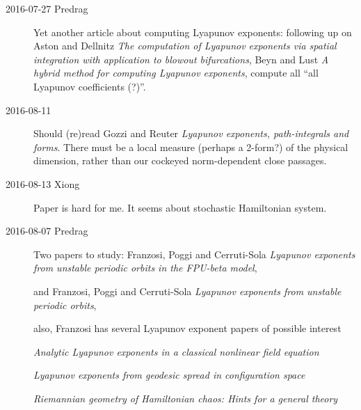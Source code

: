 \begin{description}
\item[2016-07-27 Predrag] Yet another article about computing Lyapunov
exponents: following up on Aston and Dellnitz {\em The
computation of {Lyapunov} exponents via spatial integration with
application to blowout bifurcations}, Beyn and Lust
{\em A hybrid method for computing Lyapunov exponents}, compute all ``all
Lyapunov coefficients (?)''.

\item[2016-08-11]
Should (re)read Gozzi and Reuter {\em Lyapunov exponents,
path-integrals and forms}. There must be a local measure (perhaps a
2-form?) of the physical dimension, rather than our cockeyed
norm-dependent close passages.

\item[2016-08-13 Xiong]
Paper  is hard for me. It seems about stochastic Hamiltonian
system.


\item[2016-08-07 Predrag]                                       \toCB
Two papers to study:
Franzosi, Poggi and Cerruti-Sola
{\em {Lyapunov} exponents from unstable periodic orbits in the {FPU}-beta model},

  and
Franzosi, Poggi and Cerruti-Sola
{\em Lyapunov exponents from unstable periodic orbits},

also, 
{Franzosi} has  several Lyapunov exponent papers of possible interest

{\em Analytic {Lyapunov} exponents in a classical nonlinear field equation}

{\em Lyapunov exponents from geodesic spread in configuration space}

{\em Riemannian geometry of Hamiltonian chaos: Hints for a general theory}



\end{description}

\renewcommand{\ssp}{a}
